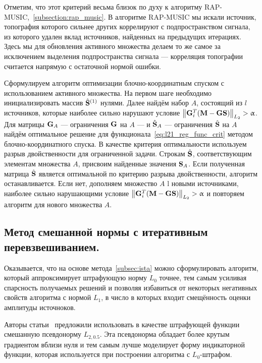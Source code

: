 Отметим, что этот критерий весьма близок по духу к алгоритму RAP-MUSIC,~\ref{subsection:rap_music}.
В алгоритме RAP-MUSIC мы искали источник, топография которого сильнее других коррелируют с подпространством сигнала,
из которого удален вклад источников, найденных на предыдущих итерациях. Здесь мы для обновления
активного множества делаем то же самое за исключением выделения подпространства сигнала ---
корреляция топографии считается напрямую с остаточной нормой ошибки.

Сформулируем алгоритм оптимизации блочно-координатным спуском с использованием
активного множества.
На первом шаге необходимо инициализировать массив
$\hat{\mathbf{S}}^{(1)}$ нулями. Далее найдём набор $A$, состоящий из $l$
источников, которые наиболее сильно нарушают условие
$\left\lVert\mathbf{G}_i^T(\mathbf{M} - \mathbf{G}\mathbf{S})\right\rVert_{L_2} > \upalpha$.
Для матрицы
$\mathbf{G}_{A}$ --- ограничения $\mathbf{G}$ на $A$ --- и $\hat{\mathbf{S}}_{A}$ --- ограничения
$\hat{\mathbf{S}}$ на $A$ найдём оптимальное решение для функционала~\ref{eq:l21_reg_func_crit}
методом блочно-координатного спуска. В качестве критерия оптимальности используем
разрыв двойственности для ограниченной задачи. Строкам $\hat{\mathbf{S}}$, соответствующим
элементам множества $A$, присвоим найденные значения $\mathbf{S}_A$. Если
полученная матрица $\hat{\mathbf{S}}$ является оптимальной по критерию разрыва двойственности,
алгоритм останавливается. Если нет, дополняем множество $A$ l новыми источниками,
наиболее сильно нарушающими условие 
$\left\lVert\mathbf{G}_i^T(\mathbf{M} - \mathbf{G}\mathbf{S})\right\rVert_{L_2} > \upalpha$ и повторяем алгоритм для
нового множества $A$.

\subsection{Метод смешанной нормы с итеративным перевзвешиванием.}
Оказывается, что на основе метода~\ref{subsec:ista}
можно сформулировать алгоритм, который аппроксимирует штрафующую норму $L_0$ точнее,
тем самым усиливая спарсность получаемых решений и позволяя избавиться
от некоторых негативных свойств алгоритма с нормой $L_{1}$, в число в которых
входит смещённость оценки амплитуды источноков.

Авторы статьи~\cite{Gramfort2014} предложили использовать в качестве штрафующей
функции смешанную псевдонорму $L_{2, 0.5}$. Эта псевдонорма обладает более
крутым градиентом вблизи нуля и тем самым лучше моделирует форму индикаторной функции,
которая используется при построении алгоритма с $L_0$-штрафом.

